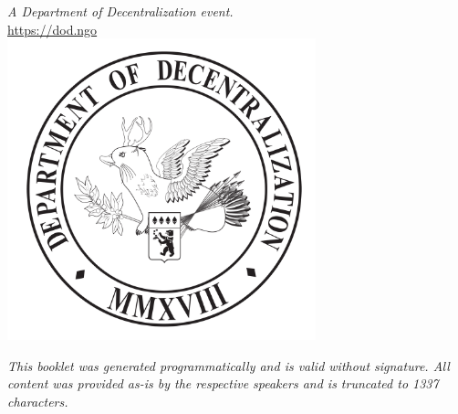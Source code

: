 \newpage
\thispagestyle{plain}
\mbox{}
\newpage
\begin{center}
  \thispagestyle{empty}
  \noindent
  \textit{\small A Department of Decentralization event.}\\
  \underline{\small https://dod.ngo}\\[3em]

  \includegraphics[width=0.67\textwidth]{wolpy.pdf}\\[1em]

  \vspace{\fill}

  \noindent\textit{\small This booklet was generated programmatically and is valid
  without signature. All content was provided as-is by the respective speakers
  and is truncated to 1337 characters.}
\end{center}
